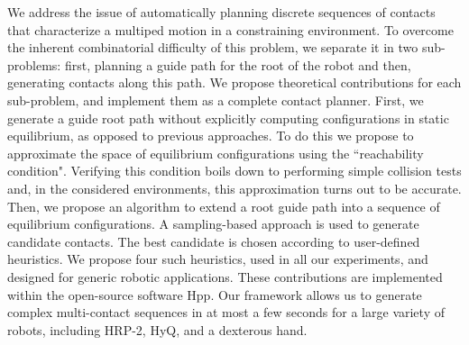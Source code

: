 We address the issue of automatically planning discrete sequences of contacts
that characterize a multiped motion in a constraining environment.
To overcome the inherent combinatorial difficulty of this problem, we separate it
in two sub-problems: first, planning a guide path for the root of the robot and
then, generating contacts along this path.
We propose theoretical contributions for each sub-problem, and implement them
as a complete contact planner. 
First, we generate a guide root path without explicitly computing configurations in static equilibrium, as opposed to previous approaches.
To do this we propose to approximate the space of equilibrium configurations using the ``reachability condition".
Verifying this condition boils down to performing simple collision tests and, in the considered environments, this approximation turns out to be accurate.
Then, we propose an algorithm to extend a root guide path into a sequence of equilibrium configurations.
A sampling-based approach is used to generate candidate contacts.
The best candidate is chosen according to user-defined heuristics. We propose four such heuristics, used in all our experiments, and 
designed for generic robotic applications.
These contributions are implemented within the open-source software Hpp. Our framework allows us to generate complex multi-contact sequences in at most a few seconds for a large variety of robots, including HRP-2, HyQ, and a dexterous hand.
